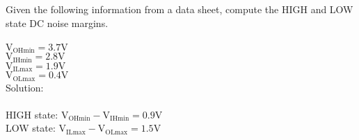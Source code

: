 Given the following information from a data sheet, compute the HIGH and LOW state DC noise margins.\\ \\
$\textrm{V}_{\textrm{OHmin}} = 3.7 \textrm{V}$\\
$\textrm{V}_{\textrm{IHmin}} = 2.8 \textrm{V}$\\
$\textrm{V}_{\textrm{ILmax}} = 1.9 \textrm{V}$\\
$\textrm{V}_{\textrm{OLmax}} = 0.4 \textrm{V}$\\

Solution: \\ \\
HIGH state: $\textrm{V}_{\textrm{OHmin}} - \textrm{V}_{\textrm{IHmin}} = 0.9 \textrm{V}$\\
LOW state: $\textrm{V}_{\textrm{ILmax}} - \textrm{V}_{\textrm{OLmax}} = 1.5 \textrm{V}$\\

